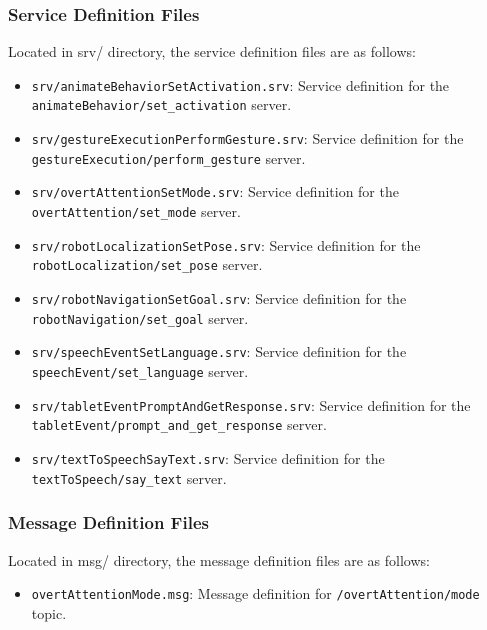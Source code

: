 \documentclass{CSSRforAfrica}
\begin{document}
\subsubsection{Service Definition Files}
Located in srv/ directory, the service definition files are as follows:
\begin{itemize}
    \item \texttt{\small srv/\textnormal{animateBehaviorSetActivation.srv}}: Service definition for the \texttt{\small animateBehavior/set\_activation} server.
    \item \texttt{\small srv/\textnormal{gestureExecutionPerformGesture.srv}}: Service definition for the
    \\ \texttt{\small gestureExecution/perform\_gesture} server.
    \item \texttt{\small srv/\textnormal{overtAttentionSetMode.srv}}: Service definition for the \texttt{\small overtAttention/set\_mode} server.
    \item \texttt{\small srv/\textnormal{robotLocalizationSetPose.srv}}: Service definition for the \texttt{\small robotLocalization/set\_pose} server.
    \item \texttt{\small srv/\textnormal{robotNavigationSetGoal.srv}}: Service definition for the \texttt{\small robotNavigation/set\_goal} server.
    \item \texttt{\small srv/\textnormal{speechEventSetLanguage.srv}}: Service definition for the \texttt{\small speechEvent/set\_language} server.
    \item \texttt{\small srv/\textnormal{tabletEventPromptAndGetResponse.srv}}: Service definition for the 
    \\ \texttt{\small tabletEvent/prompt\_and\_get\_response} server.
    \item \texttt{\small srv/\textnormal{textToSpeechSayText.srv}}: Service definition for the \texttt{\small textToSpeech/say\_text} server.

\end{itemize}

\subsubsection{Message Definition Files}
Located in msg/ directory, the message definition files are as follows:
\begin{itemize}
    \item \texttt{\small overtAttentionMode.msg}: Message definition for \texttt{\small /overtAttention/mode} topic.
\end{itemize}
\end{document}

